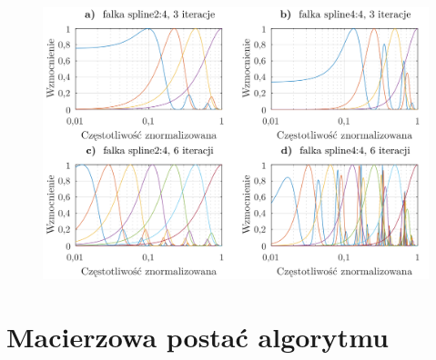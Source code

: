 \begin{figure}[htb!]
\begin{center}
\includegraphics{obrazki/bank_spline_demo}
\end{center}
\end{figure}

\section{Macierzowa postać algorytmu}

